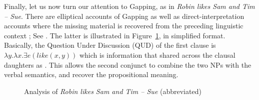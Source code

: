 \documentclass[output=paper
                ,modfonts
                ,nonflat
	        ,collection
	        ,collectionchapter
	        ,collectiontoclongg
 	        ,biblatex
                ,babelshorthands
                ,newtxmath
                ,draftmode
                ,colorlinks, citecolor=brown
]{./langsci/langscibook}
\begin{document}
Finally, let us now turn our attention to Gapping, as in 
\emph{Robin likes Sam and Tim -- Sue}.
There are elliptical accounts of Gapping  \citep{chaves06} as well as direct-interpretation accounts where the missing material is recovered from the preceding linguistic context  \citep{mouret, Mouret:06,Abeille:Blbie:Mouret:14,sangheepark}; See . The latter is illustrated in Figure~\ref{gfig}, in simplified format. Basically, the Question Under Discussion (QUD) of the first clause is $\lambda y.\lambda x. \exists e(like(x,y))$ which is information that shared across the clausal daughters as .
This allows the second conjunct to combine the two NPs with the verbal semantics, and recover the propositional meaning.


\begin{figure}
\oneline{%
\begin{forest}
[S\ms{
      qud     & \ibox{1}\\
      content & \menge{ $\exists e'(like(robin,sam)) \wedge \exists e(like(tim,sue))$ }\\
     } 
 [S\ms{  qud & \ibox{1}\\
         content & \menge{ \ibox{0} $\exists e'(like(robin,sam))$ } %
      } ]
 [S\ms{ qud & \ibox{1}\\
          content & \menge{ \ibox{0} $\wedge \exists e(like(tim,sue))$ }
        }
 [Conj [and]]
 [S\ms{ qud & \ibox{1} \menge{ $\lambda y. \lambda x. \exists e(like(x,y))$ }\\
        content & \menge{ $\exists e(like(t,s))$ } } 
   [NP\ms{ content & \menge{ $tim$ }}]
   [NP\ms{ content & \menge{ $sue$ }}] ]
]]
\end{forest}
}
\caption{Analysis of \emph{Robin likes Sam and Tim -- Sue} (abbreviated)}\label{gfig}
\end{figure}
\end{document}

